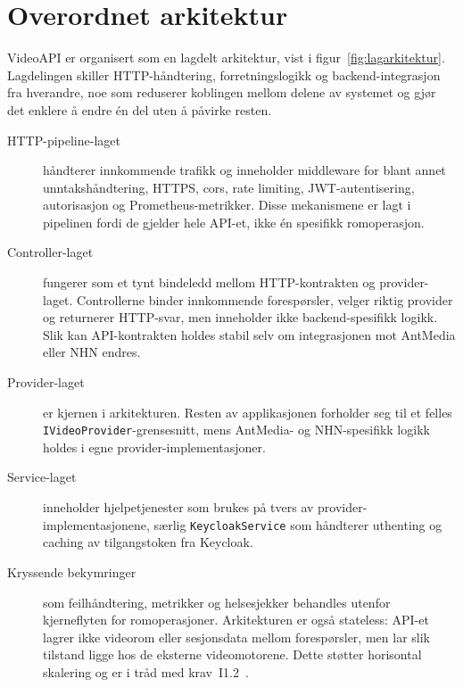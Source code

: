 \section{Overordnet arkitektur}
\label{sec:arkitektur}

VideoAPI er organisert som en lagdelt arkitektur, vist i figur~\ref{fig:lagarkitektur}. Lagdelingen skiller HTTP-håndtering, forretningslogikk og backend-integrasjon fra hverandre, noe som reduserer koblingen mellom delene av systemet og gjør det enklere å endre én del uten å påvirke resten.



\begin{description}
    \item[HTTP-pipeline-laget] håndterer innkommende trafikk og inneholder middleware for blant annet unntakshåndtering, HTTPS, \gls{cors}, rate limiting, JWT-autentisering, autorisasjon og Prometheus-metrikker. Disse mekanismene er lagt i pipelinen fordi de gjelder hele API-et, ikke én spesifikk romoperasjon.
    
    \item[Controller-laget] fungerer som et tynt bindeledd mellom HTTP-kontrakten og provider-laget. Controllerne binder innkommende forespørsler, velger riktig provider og returnerer HTTP-svar, men inneholder ikke backend-spesifikk logikk. Slik kan API-kontrakten holdes stabil selv om integrasjonen mot AntMedia eller NHN endres.
    
    \item[Provider-laget] er kjernen i arkitekturen. Resten av applikasjonen forholder seg til et felles \texttt{IVideoProvider}-grensesnitt, mens AntMedia- og NHN-spesifikk logikk holdes i egne provider-implementasjoner.
    
    \item[Service-laget] inneholder hjelpetjenester som brukes på tvers av provider-implementasjonene, særlig \texttt{KeycloakService} som håndterer uthenting og caching av tilgangstoken fra Keycloak.
    
    \item[Kryssende bekymringer] som feilhåndtering, metrikker og helsesjekker behandles utenfor kjerneflyten for romoperasjoner. Arkitekturen er også stateless: API-et lagrer ikke videorom eller sesjonsdata mellom forespørsler, men lar slik tilstand ligge hos de eksterne videomotorene. Dette støtter horisontal skalering og er i tråd med krav~I1.2~\cite{hdo_kravspec}.
\end{description}
\newpage
